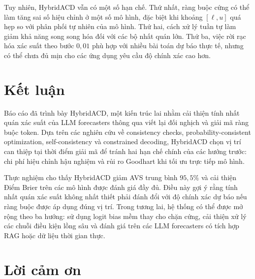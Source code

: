 \documentclass[pdflatex,sn-mathphys-num,oneside]{sn-jnl}
\begin{document}
Tuy nhiên, HybridACD vẫn có một số hạn chế. Thứ nhất, ràng buộc cứng có thể làm tăng sai số hiệu chỉnh ở một số mô hình, đặc biệt khi khoảng $[\ell,u]$ quá hẹp so với phân phối tự nhiên của mô hình. Thứ hai, cách xử lý tuần tự làm giảm khả năng song song hóa đối với các bộ nhất quán lớn. Thứ ba, việc rời rạc hóa xác suất theo bước $0,01$ phù hợp với nhiều bài toán dự báo thực tế, nhưng có thể chưa đủ mịn cho các ứng dụng yêu cầu độ chính xác cao hơn.

\section{Kết luận}\label{sec:conclusion}

Báo cáo đã trình bày HybridACD, một kiến trúc lai nhằm cải thiện tính nhất quán xác suất của LLM forecasters thông qua viết lại đối nghịch và giải mã ràng buộc token. Dựa trên các nghiên cứu về consistency checks, probability-consistent optimization, self-consistency và constrained decoding, HybridACD chọn vị trí can thiệp tại thời điểm giải mã để tránh hai hạn chế chính của các hướng trước: chi phí hiệu chỉnh hậu nghiệm và rủi ro Goodhart khi tối ưu trực tiếp mô hình.

Thực nghiệm cho thấy HybridACD giảm AVS trung bình $95,5\%$ và cải thiện Điểm Brier trên các mô hình được đánh giá đầy đủ. Điều này gợi ý rằng tính nhất quán xác suất không nhất thiết phải đánh đổi với độ chính xác dự báo nếu ràng buộc được áp dụng đúng vị trí. Trong tương lai, hệ thống có thể được mở rộng theo ba hướng: sử dụng logit bias mềm thay cho chặn cứng, cải thiện xử lý các chuỗi điều kiện lồng sâu và đánh giá trên các LLM forecasters có tích hợp RAG hoặc dữ liệu thời gian thực.

\section*{Lời cảm ơn}

\end{document}
